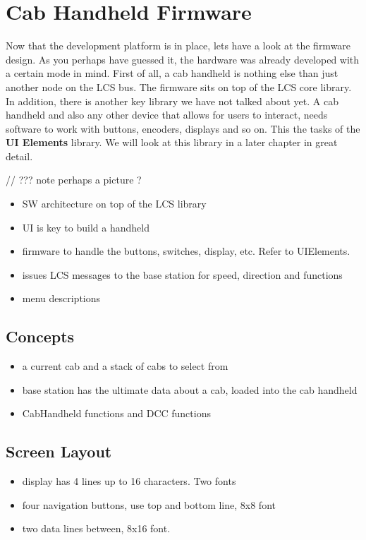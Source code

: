 \chapter{Cab Handheld Firmware}

Now that the development platform is in place, lets have a look at the firmware design. As you perhaps have guessed it, the hardware was already developed with a certain mode in mind. First of all, a cab handheld is nothing else than just another node on the LCS bus. The firmware sits on top of the LCS core library. In addition, there is another key library we have not talked about yet. A cab handheld and also any other device that allows for users to interact, needs software to work with buttons, encoders, displays and so on. This the tasks of the \textbf{UI Elements } library. We will look at this library in a later chapter in great detail.

// ??? note perhaps a picture ?

\begin{itemize}
\item SW architecture on top of the LCS library
\item UI is key to build a handheld
\item firmware to handle the buttons, switches, display, etc. Refer to UIElements.
\item issues LCS messages to the base station for speed, direction and functions
\item menu descriptions
\end{itemize}

\section{Concepts}

\begin{itemize}
\item a current cab and a stack of cabs to select from
\item base station has the ultimate data about a cab, loaded into the cab handheld
\item CabHandheld functions and DCC functions
\end{itemize}


\section{Screen Layout}

\begin{itemize}
\item display has 4 lines up to 16 characters. Two fonts
\item four navigation buttons, use top and bottom line, 8x8 font
\item two data lines between, 8x16 font.
\end{itemize}

